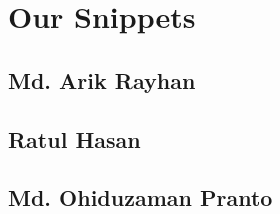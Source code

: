 \chapter{Our Snippets}

\section{Md. Arik Rayhan}

\section{Ratul Hasan}

\section{Md. Ohiduzaman Pranto}
